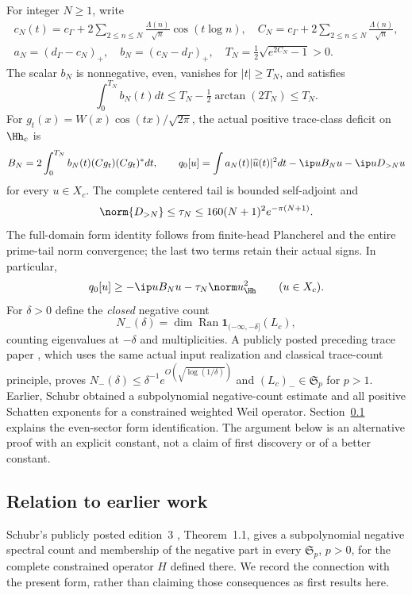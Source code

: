 For integer $N\ge1$, write
\begin{gather*}
 c_N(t)=c_\Gamma+2\sum_{2\le n\le N}\frac{\Lambda(n)}{\sqrt n}\cos(t\log n),\quad
 C_N=c_\Gamma+2\sum_{2\le n\le N}\frac{\Lambda(n)}{\sqrt n},\\
 a_N=(d_\Gamma-c_N)_+,\quad b_N=(c_N-d_\Gamma)_+,\quad
 T_N=\tfrac12\sqrt{e^{2C_N}-1}>0.
\end{gather*}
The scalar $b_N$ is nonnegative, even, vanishes for $|t|\ge T_N$, and satisfies
\begin{equation}\label{vfourD:b-integral}
 \int_0^{T_N}b_N(t)dt\le T_N-\tfrac12\arctan(2T_N)\le T_N.
\end{equation}
For $g_t(x)=W(x)\cos(tx)/\sqrt{2\pi}$, the actual positive trace-class deficit on $\Hh_c$ is
\begin{equation}\label{vfourD:Bform}
 B_N=2\int_0^{T_N}b_N(t)(Cg_t)(Cg_t)^*dt,\qquad
 q_0[u]=\int a_N(t)|\widehat u(t)|^2dt-\ip u{B_Nu}-\ip u{D_{>N}u}
\end{equation}
for every $u\in X_c$. The complete centered tail is bounded self-adjoint and
\begin{equation}\label{vfourD:tail}
 \norm{D_{>N}}\le\tau_N\le160(N+1)^2e^{-\pi(N+1)}.
\end{equation}
The full-domain form identity follows from finite-head Plancherel and the entire prime-tail norm convergence; the last two terms retain their actual signs. In particular,
\begin{equation}\label{vfourD:lower}
 q_0[u]\ge-\ip u{B_Nu}-\tau_N\norm u_{\Hh}^2\qquad(u\in X_c).
\end{equation}
For $\delta>0$ define the \emph{closed} negative count
\[N_-(\delta)=\dim\operatorname{Ran}\mathbf1_{(-\infty,-\delta]}(L_c),\]
counting eigenvalues at $-\delta$ and multiplicities. A publicly posted preceding trace paper \cite{vfourTrace}, which uses the same actual input realization and classical trace-count principle, proves $N_-(\delta)\le\delta^{-1}e^{O(\sqrt{\log(1/\delta)})}$ and $(L_c)_-\in\mathfrak S_p$ for $p>1$. Earlier, Schubr \cite[Theorem~1.1]{vfourSchubr} obtained a subpolynomial negative-count estimate and all positive Schatten exponents for a constrained weighted Weil operator. Section~\ref{vfourD:prior} explains the even-sector form identification. The argument below is an alternative proof with an explicit constant, not a claim of first discovery or of a better constant.

\subsection{Relation to earlier work}\label{vfourD:prior}
Schubr's publicly posted edition~3 \cite{vfourSchubr}, Theorem~1.1, gives a subpolynomial negative spectral count and membership of the negative part in every $\mathfrak S_p$, $p>0$, for the complete constrained operator $H$ defined there. We record the connection with the present form, rather than claiming those consequences as first results here.

